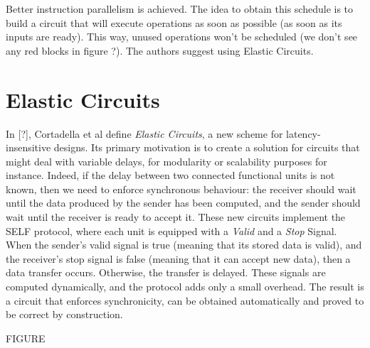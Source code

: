 \documentclass{article}
\def\todo#1{{\color{red}#1}}
\begin{document}
Better instruction parallelism is achieved. The idea to obtain this schedule is to build a circuit that will execute operations as soon as possible (as soon as its inputs are ready). This way, unused operations won't be scheduled (we don't see any red blocks in figure ?). The authors suggest using Elastic Circuits.

\section{Elastic Circuits}

In [?], Cortadella et al define \textit{Elastic Circuits}, a new scheme for latency-insensitive designs.
Its primary motivation is to create a solution for circuits that might deal with variable delays, for modularity or scalability purposes for instance.
Indeed, if the delay between two connected functional units is not known, then we need to enforce synchronous behaviour: the receiver should wait until the data produced by the sender has been computed, and the sender should wait until the receiver is ready to accept it.
These new circuits implement the SELF protocol, where each unit is equipped with a \textit{Valid} and a \textit{Stop} Signal. When the sender's valid signal is true (meaning that its stored data is valid), and the receiver's stop signal is false (meaning that it can accept new data), then a data transfer occurs. Otherwise, the transfer is delayed. These signals are computed dynamically, and the protocol adds only a small overhead. The result is a circuit that enforces synchronicity, can be obtained automatically and proved to be correct by construction.

\todo{FIGURE}
\end{document}
